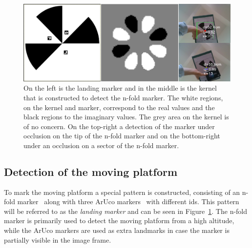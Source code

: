 \documentclass[conference]{IEEEtran}
\begin{document}
\begin{figure}
\centering
\includegraphics[scale=0.26]{n-fold-for-landing3.png}
\caption{On the left is the landing marker and in the middle is the kernel that is constructed to detect the n-fold marker. The white regions, on the kernel and marker, correspond to the real values and the black regions to the imaginary values. The grey area on the kernel is of no concern. 
On the top-right a detection of the marker under occlusion on the tip of the n-fold marker
and on the bottom-right under an occlusion on a sector of the n-fold marker.}
\label{fig:LandingMarker}
\end{figure}

\subsection{Detection of the moving platform}
\label{sec:Detection}

To mark the moving platform a special pattern is constructed,
consisting of an n-fold marker~\cite{NfoldMarker} along with three
ArUco markers~\cite{ArUco_marker} with different ids. This pattern
will be referred to as the \emph{landing marker} and can be seen in
Figure~\ref{fig:LandingMarker}. The n-fold marker is primarily used to
detect the moving platform from a high altitude, while the ArUco
markers are used as extra landmarks in case the marker is partially
visible in the image frame.


\end{document}
